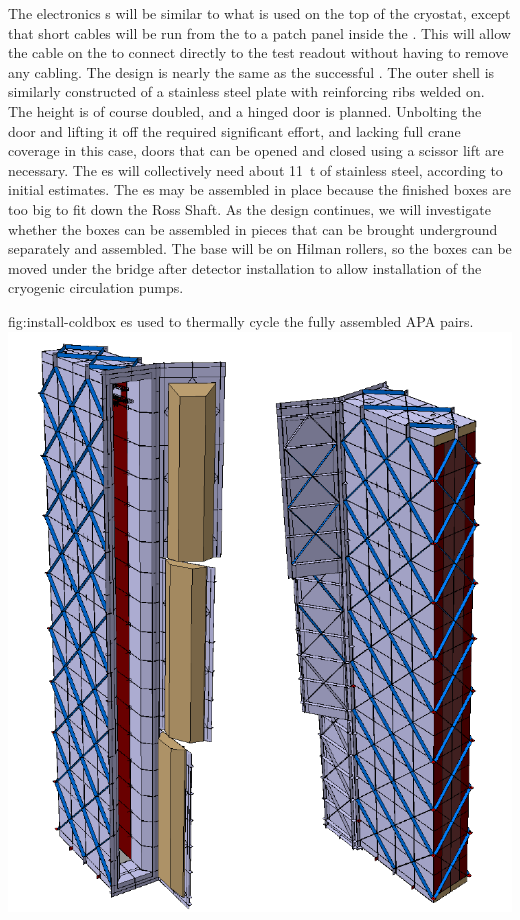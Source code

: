  
The \coldbox electronics \fdth{}s  will be  similar to what is used on the top of the  cryostat, except that short cables will be run from the   to a patch panel inside the \coldbox. This will allow the cable on the  to connect directly to the test readout without having to remove any cabling. The \coldbox  design is nearly the same as the successful  \coldbox. The outer shell is similarly constructed of a stainless steel plate with reinforcing ribs welded on. The height is of course doubled, and a hinged door is planned. Unbolting the door and lifting it off the  \coldbox required significant effort, and lacking full crane coverage in this case, doors that can be opened and closed using a scissor lift are necessary. The  \coldbox{}es will collectively need about \SI{11}{t} of stainless steel, according to initial estimates. The \coldbox{}es may  be assembled in place because the finished boxes are too big to fit down the Ross Shaft. As the design continues, %
we will investigate whether the boxes can be assembled in pieces that can be brought underground separately and assembled. 
The \coldbox base will be on Hilman rollers, so the boxes can be moved under the bridge after detector installation  to allow installation of the cryogenic circulation pumps.

\begin{dunefigure}{fig:install-coldbox}
  {\coldbox{}es used to thermally cycle the fully assembled APA pairs. }
\includegraphics[width=.5\textwidth]{graphics/install-coldbox.pdf}
\end{dunefigure}


